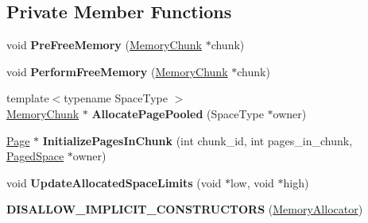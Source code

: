 \subsection*{Private Member Functions}
\begin{DoxyCompactItemize}
\item 
void {\bfseries Pre\+Free\+Memory} (\hyperlink{classv8_1_1internal_1_1_memory_chunk}{Memory\+Chunk} $\ast$chunk)\hypertarget{classv8_1_1internal_1_1_memory_allocator_ae2c689d0539a87ee5ce674c52cfa2f44}{}\label{classv8_1_1internal_1_1_memory_allocator_ae2c689d0539a87ee5ce674c52cfa2f44}

\item 
void {\bfseries Perform\+Free\+Memory} (\hyperlink{classv8_1_1internal_1_1_memory_chunk}{Memory\+Chunk} $\ast$chunk)\hypertarget{classv8_1_1internal_1_1_memory_allocator_a869f4348cb329cff6ee1d6963cf15915}{}\label{classv8_1_1internal_1_1_memory_allocator_a869f4348cb329cff6ee1d6963cf15915}

\item 
{\footnotesize template$<$typename Space\+Type $>$ }\\\hyperlink{classv8_1_1internal_1_1_memory_chunk}{Memory\+Chunk} $\ast$ {\bfseries Allocate\+Page\+Pooled} (Space\+Type $\ast$owner)\hypertarget{classv8_1_1internal_1_1_memory_allocator_a2f7ed06d6f1cfae71964d4bec8eb8065}{}\label{classv8_1_1internal_1_1_memory_allocator_a2f7ed06d6f1cfae71964d4bec8eb8065}

\item 
\hyperlink{classv8_1_1internal_1_1_page}{Page} $\ast$ {\bfseries Initialize\+Pages\+In\+Chunk} (int chunk\+\_\+id, int pages\+\_\+in\+\_\+chunk, \hyperlink{classv8_1_1internal_1_1_paged_space}{Paged\+Space} $\ast$owner)\hypertarget{classv8_1_1internal_1_1_memory_allocator_a8da7c61175d0e94515e5b4e2e2f2ce43}{}\label{classv8_1_1internal_1_1_memory_allocator_a8da7c61175d0e94515e5b4e2e2f2ce43}

\item 
void {\bfseries Update\+Allocated\+Space\+Limits} (void $\ast$low, void $\ast$high)\hypertarget{classv8_1_1internal_1_1_memory_allocator_a462aec1c2af0580710f9841ea0a7e2dc}{}\label{classv8_1_1internal_1_1_memory_allocator_a462aec1c2af0580710f9841ea0a7e2dc}

\item 
{\bfseries D\+I\+S\+A\+L\+L\+O\+W\+\_\+\+I\+M\+P\+L\+I\+C\+I\+T\+\_\+\+C\+O\+N\+S\+T\+R\+U\+C\+T\+O\+RS} (\hyperlink{classv8_1_1internal_1_1_memory_allocator}{Memory\+Allocator})\hypertarget{classv8_1_1internal_1_1_memory_allocator_ac98b096c1567f0b53c8946ebd197c41a}{}\label{classv8_1_1internal_1_1_memory_allocator_ac98b096c1567f0b53c8946ebd197c41a}

\end{DoxyCompactItemize}
